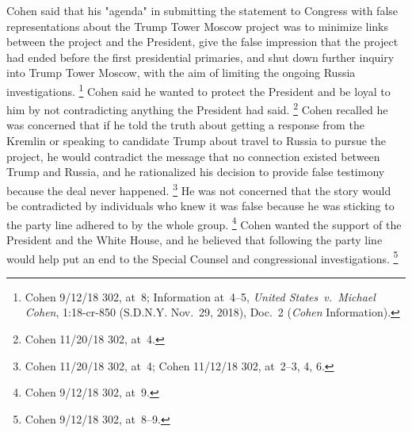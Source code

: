 {Cohen said that his "agenda" in submitting the statement to Congress with false representations about the Trump Tower Moscow project was to minimize links between the project and the President, give the false impression that the project had ended before the first presidential primaries, and shut down further inquiry into Trump Tower Moscow, with the aim of limiting the ongoing Russia investigations.%
\footnote{Cohen 9/12/18 302, at~8;
Information at~4--5, \textit{United States~v.\ Michael Cohen}, 1:18-cr-850 (S.D.N.Y. Nov.~29, 2018), Doc.~2 (\textit{Cohen} Information).}
Cohen said he wanted to protect the President and be loyal to him by not contradicting anything the President had said.%
\footnote{Cohen 11/20/18 302, at~4.}
Cohen recalled he was concerned that if he told the truth about getting a response from the Kremlin or speaking to candidate Trump about travel to Russia to pursue the project, he would contradict the message that no connection existed between Trump and Russia, and he rationalized his decision to provide false testimony because the deal never happened.%
\footnote{Cohen 11/20/18 302, at~4;
Cohen 11/12/18 302, at~2--3, 4, 6.}
He was not concerned that the story would be contradicted by individuals who knew it was false because he was sticking to the party line adhered to by the whole group.%
\footnote{Cohen 9/12/18 302, at~9.}
Cohen wanted the support of the President and the White House, and he believed that following the party line would help put an end to the Special Counsel and congressional investigations.%
\footnote{Cohen 9/12/18 302, at~8--9.}

}
